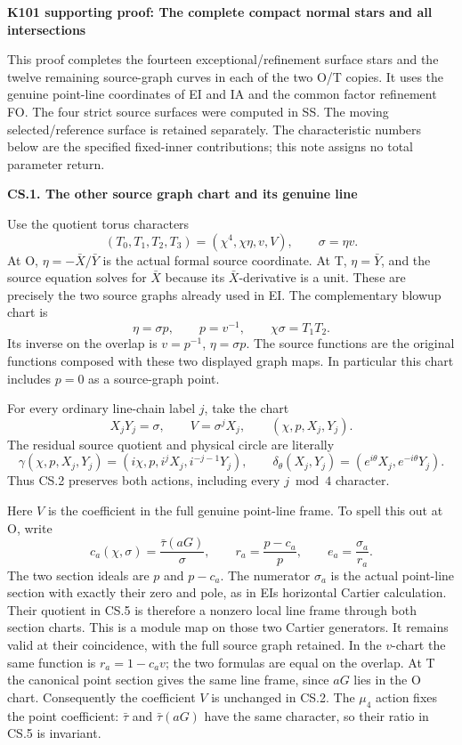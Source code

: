 \par\bigskip\noindent\textbf{K101 supporting proof: The complete compact normal stars and all intersections}\par\nobreak
This proof completes the fourteen exceptional/refinement surface stars and
the twelve remaining source-graph curves in each of the two O/T copies.
It uses the genuine point-line coordinates of EI and IA and the common
factor refinement FO. The four strict source surfaces were computed in
SS. The moving selected/reference surface is retained separately.
The characteristic numbers below are the specified fixed-inner
contributions; this note assigns no total parameter return.

\par

\medskip\noindent\textbf{CS.1. The other source graph chart and its genuine line}

\par\nobreak

Use the quotient torus characters
\[
 (T_0,T_1,T_2,T_3)=(\chi^4,\chi\eta,v,V),
 \qquad \sigma=\eta v.
 \tag{CS.1}
\]
At O, \(\eta=-\bar X/\bar Y\) is the actual formal source
coordinate. At T, \(\eta=\bar Y\), and the source equation
solves for \(\bar X\) because its \(\bar X\)-derivative is a unit.
These are precisely the two source graphs already used in EI.
The complementary blowup chart is
\[
 \eta=\sigma p,\qquad
 p=v^{-1},\qquad
 \chi\sigma=T_1T_2.
 \tag{CS.2}
\]
Its inverse on the overlap is \(v=p^{-1}\), \(\eta=\sigma p\).
The source functions are the original functions composed with
these two displayed graph maps. In particular this chart includes
\(p=0\) as a source-graph point.

For every ordinary line-chain label \(j\), take the chart
\[
 X_jY_j=\sigma,\qquad V=\sigma^jX_j,
 \qquad (\chi,p,X_j,Y_j).
 \tag{CS.3}
\]
The residual source quotient and physical circle are literally
\[
 \gamma(\chi,p,X_j,Y_j)
   =(i\chi,p,i^jX_j,i^{-j-1}Y_j),\qquad
 \delta_\theta(X_j,Y_j)
   =(e^{i\theta}X_j,e^{-i\theta}Y_j).
 \tag{CS.4}
\]
Thus CS.2 preserves both actions, including every \(j\bmod4\)
character.

Here \(V\) is the coefficient in the full genuine point-line frame.
To spell this out at O, write
\[
 c_a(\chi,\sigma)=\frac{\bar\tau(aG)}{\sigma},
 \qquad
 r_a=\frac{p-c_a}{p},\qquad
 e_a=\frac{\sigma_a}{r_a}.
 \tag{CS.5}
\]
The two section ideals are \(p\) and \(p-c_a\). The numerator
\(\sigma_a\) is the actual point-line section with exactly their
zero and pole, as in EI\textquotesingle s horizontal Cartier calculation. Their
quotient in CS.5 is therefore a nonzero local line frame through
both section charts. This is a module map on those two Cartier
generators. It remains valid at their coincidence, with the full
source graph retained. In the \(v\)-chart the same function is
\(r_a=1-c_av\); the two formulas are equal on the overlap.
At T the canonical point section gives the same line frame,
since \(aG\) lies in the O chart. Consequently the coefficient
\(V\) is unchanged in CS.2. The \(\mu_4\) action fixes the point
coefficient: \(\bar\tau\) and \(\bar\tau(aG)\) have the same
character, so their ratio in CS.5 is invariant.

